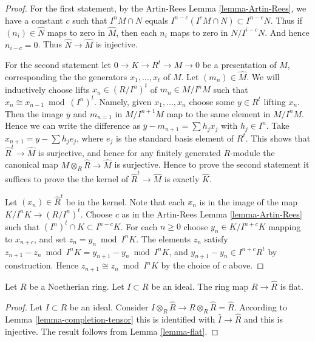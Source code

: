 \begin{proof}
For the first statement, by the Artin-Rees Lemma \ref{lemma-Artin-Rees},
we have a constant $c$ such that $I^nM \cap N$
equals $I^{n-c}(I^cM \cap N) \subset I^{n-c}N$.
Thus if $(n_i) \in \hat N$ maps to zero in
$\hat M$, then each $n_i$ maps to zero in $N/I^{i-c}N$.
And hence $n_{i-c} = 0$. Thus $\hat N \to \hat M$ is injective.

\medskip\noindent
For the second statement let $0\to K \to R^t \to M \to 0$
be a presentation of $M$, corresponding the the generators
$x_1,\ldots,x_t$ of $M$. Let $(m_n) \in \hat M$.
We will inductively choose lifts $x_n \in (R/I^n)^t$ of 
$m_n \in M/I^nM$ such that $x_n \cong x_{n-1} \bmod (I^n)^t$.
Namely, given $x_1,\ldots, x_n$ choose some $y \in R^t$
lifting $x_n$. Then the image $\overline{y}$ and $m_{n=1}$
in $M/I^{n+1}M$ map to the same element in $M/I^nM$. 
Hence we can write the difference as
$\overline{y} - m_{n+1} = \sum h_j x_j$ with
$h_j \in I^n$. Take $x_{n+1} = y - \sum h_j e_j$, where
$e_j$ is the standard basis element of $R^t$.
This shows that $\hat R^t \to \hat M$ is surjective,
and hence for any finitely generated $R$-module the
canonical map $M \otimes_R \hat R \to \hat M$ is surjective.
Hence to prove the second statement it suffices
to prove the the kernel of $\hat R^t \to \hat M$ is
exactly $\hat K$.

\medskip\noindent
Let $(x_n) \in \hat R^t$ be in the kernel. Note that
each $x_n$ is in the image of the map $K/I^nK \to (R/I^n)^t$.
Choose $c$ as in the Artin-Rees
Lemma \ref{lemma-Artin-Rees} such that $(I^n)^t \cap K 
\subset I^{n-c} K$. For each $n \geq 0$ choose 
$y_n \in K/I^{n+c}K$ mapping to $x_{n+c}$, and
set $z_n = y_n \bmod I^nK$. The elements $z_n$ satisfy $z_{n+1} - z_n \bmod I^nK
= y_{n+1} - y_{n} \bmod I^nK$, and $y_{n+1} - y_n \in
I^{n+c}R^t$ by construction. Hence $z_{n+1} \cong z_n \bmod I^nK$
by the choice of $c$ above.
\end{proof}

\begin{lemma}
\label{lemma-completion-flat}
Let $R$ be a Noetherian ring.
Let $I \subset R$ be an ideal.
The ring map $R \to \hat R$ is flat.
\end{lemma}

\begin{proof}
Let $I \subset R$ be an ideal.
Consider $I \otimes_R \hat R \to R\otimes_R \hat R = \hat R$.
According to Lemma \ref{lemma-completion-tensor} this
is identified with $\hat I \to \hat R$ and this is injective.
The result follows from Lemma \ref{lemma-flat}.
\end{proof}


